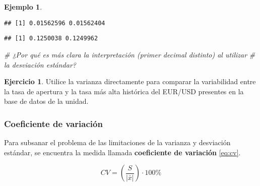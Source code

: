 \documentclass[
]{book}
\newenvironment{Shaded}{\begin{snugshade}}{\end{snugshade}}
\newcommand{\CommentTok}[1]{\textcolor[rgb]{0.56,0.35,0.01}{\textit{#1}}}
\newcommand{\FunctionTok}[1]{\textcolor[rgb]{0.00,0.00,0.00}{#1}}
\newcommand{\NormalTok}[1]{#1}
\newcommand{\SpecialCharTok}[1]{\textcolor[rgb]{0.00,0.00,0.00}{#1}}
\theoremstyle{definition}
\theoremstyle{definition}
\newtheorem{example}{Ejemplo}[chapter]
\theoremstyle{definition}
\newtheorem{exercise}{Ejercicio}[chapter]
\theoremstyle{definition}
\theoremstyle{remark}
\begin{document}
\begin{example}
\begin{enumerate}
\begin{verbatim}
## [1] 0.01562596 0.01562404
\end{verbatim}

\begin{Shaded}
\end{Shaded}

\begin{verbatim}
## [1] 0.1250038 0.1249962
\end{verbatim}

\begin{Shaded}
\begin{Highlighting}[]
\CommentTok{\# ¿Por qué es más clara la interpretación (primer decimal distinto) al utilizar}
\CommentTok{\# la desviación estándar?}
\end{Highlighting}
\end{Shaded}
\end{enumerate}

\end{example}

\begin{exercise}
Utilice la varianza directamente para comparar la variabilidad entre la tasa de apertura y la tasa más alta histórica del EUR/USD presentes en la base de datos de la unidad.
\end{exercise}

\hypertarget{coeficiente-de-variaciuxf3n}{%
\subsubsection*{Coeficiente de variación}\label{coeficiente-de-variaciuxf3n}}

Para subsanar el problema de las limitaciones de la varianza y desviación estándar, se encuentra la medida llamada \textbf{coeficiente de variación} \eqref{eq:cv}.

\begin{equation}
CV = \left(\frac{S}{|\bar{x}|}\right)\cdot 100\%
\label{eq:cv}
\end{equation}
\end{document}
